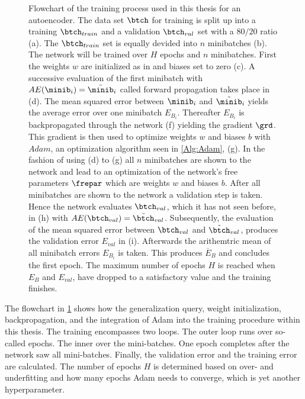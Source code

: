 \begin{figure}[htbp!]
	\centering
	
	\caption{Flowchart of the training process used in this thesis for an autoencoder. The data set \(\btch\) for training is split up into a training \(\btch_{train}\) and a validation \(\btch_{val}\) set with a \(80/20\) ratio (a). The \(\btch_{train}\) set is equally devided into \(n\) minibatches (b). The network will be trained over \(H\) epochs and \(n\) minibatches. First the weights \(w\) are initialized as in \cite{LeCun98} and biases set to zero (c). A successive evaluation of the first minibatch with \(AE(\minib_{i})=\tilde{\minib}_{i}\) called forward propagation takes place in (d). The mean squared error between \(\minib_{i}\) and \(\tilde{\minib}_{i}\) yields the average error over one minibatch \(E_{B_i}\). Thereafter \(E_{B_i}\) is backpropagated through the network (f) yielding the gradient \(\grd\). This gradient is then used to optimize weights \(w\) and biases \(b\) with  \(Adam\), an optimization algorithm seen in \cref{Alg:Adam}, (g). In the fashion of using (d) to (g) all \(n\) minibatches are shown to the network and lead to an optimization of the network's free parameters \(\frepar\) which are weights \(w\) and biases \(b\). After all minibatches are shown to the network a validation step is taken. Hence the network evaluates \(\btch_{val}\), which it has not seen before, in (h) with \(AE(\btch_{val})=\tilde{\btch}_{val}\). Subsequently, the evaluation of the mean squared error between \(\btch_{val}\) and \(\tilde{\btch}_{val}\), produces the validation error \(E_{val}\) in (i). Afterwards the arithemtric mean of all minibatch errors \(E_{B_i}\) is taken. This produces \(\overline{E}_B\) and concludes the first epoch. The maximum number of epochs \(H\) is reached when \(E_B\) and \(E_{val}\), have dropped to a satisfactory value and the training finishes.}
	\label{Fig:Training}
\end{figure}\noindent
The flowchart in \cref{Fig:Training} shows how the generalization query, weight initialization, backpropagation, and the integration of Adam into the training procedure within this thesis. The training encompasses two loops. The outer loop runs over so-called epochs. The inner over the mini-batches. One epoch completes after the network saw all mini-batches.  Finally, the validation error and the training error are calculated. The number of epochs \(H\) is determined based on over- and underfitting and how many epochs Adam needs to converge, which is yet another hyperparameter.\\

